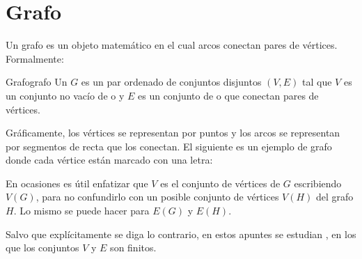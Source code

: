 \section{Grafo}
\label{sec:grafo}

Un grafo es un objeto matemático en el cual arcos conectan pares de vértices. Formalmente:

\begin{definicion}{Grafo}{grafo}
  Un  \(G\) es un par ordenado de conjuntos disjuntos \((V, E)\) tal que \(V\) es un conjunto no vacío de  o  y \(E\) es un conjunto de  o  que conectan pares de vértices.
\end{definicion}

Gráficamente, los vértices se representan por puntos y los arcos se representan por segmentos de recta que los conectan. El siguiente es un ejemplo de grafo donde cada vértice están marcado con una letra:

\begin{center}
  \label{fig:ejemplo_grafo}
\end{center}

En ocasiones es útil enfatizar que \(V\) es el conjunto de vértices de \(G\) escribiendo \(V(G)\), para no confundirlo con un posible conjunto de vértices \(V(H)\) del grafo \(H\). Lo mismo se puede hacer para \(E(G)\) y \(E(H)\).

Salvo que explícitamente se diga lo contrario, en estos apuntes se estudian , en los que los conjuntos \(V\) y \(E\) son finitos.